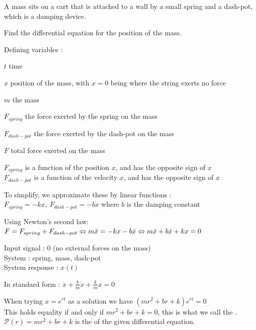 \documentclass[11pt, openright]{book}
\begin{document}
A mass sits on a cart that is attached to a wall by a small spring and a dash-pot, which is a damping device.

Find the differential equation for the position of the mass.
\begin{dent}{Defining variables :}
    \begin{items}{-10pt}{-10pt}
        \item $t$ time
        \item $x$ position of the mass, with $x=0$ being where the string exerts no force
        \item $m$ the mass
        \item $F_{spring}$ the force exerted by the spring on the mass
        \item $F_{dash-pot}$ the force exerted by the dash-pot on the mass
        \item $F$ total force exerted on the mass
    \end{items}

    $F_{spring}$ is a function of the position $x$, and has the opposite sign of $x$\\
    $F_{dash-pot}$ is a function of the velocity $x$, and has the opposite sign of $x$
\end{dent}

To simplify, we approximate these by linear functions : $F_{spring}=-kx,\ F_{dash-pot}=-b\dot{x}$ where $b$ is the damping constant

Using Newton's second law: $F=F_{spring}+F_{dash-pot}\Leftrightarrow m\ddot{x}=-kx-b\dot{x}\Leftrightarrow m\ddot{x}+b\dot{x}+kx=0$\vspace{-30pt}

\begin{dent}{}

    Input signal \hspace{8mm}: $0$ (no external forces on the mass)\\
    System\hspace{15.7mm} : spring, mass, dash-pot\\
    System response : $x(t)$
\end{dent}

In standard form : $\ddot{x}+\frac{b}{m}\dot{x}+\frac{k}{m}x=0$

When trying $x=e^{rt}$ as a solution we have $(mr^2+br+k)e^{rt}=0$\\
This holds equality if and only if $mr^2+br+k=0$, this is what we call the .\\
$\mathcal{P}(r)=mr^2+br+k$ is the  of the given differential equation.
\end{document}
